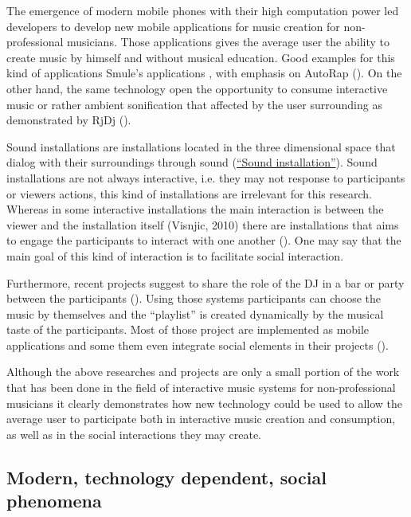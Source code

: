 The emergence of modern mobile phones with their high computation power led developers to develop new mobile applications for music creation for non-professional musicians. Those applications gives the average user the ability to create music by himself and without musical education. Good examples for this kind of applications Smule's applications , with emphasis on AutoRap (). On the other hand, the same technology open the opportunity to consume interactive music or rather ambient sonification that affected by the user surrounding as demonstrated by RjDj ().

Sound installations are installations located in the three dimensional space that dialog with their surroundings through sound (\href{http://en.wikipedia.org/wiki/Sound_installation}{``Sound installation''}). Sound installations are not always interactive, i.e. they may not response to participants or viewers actions, this kind of installations are irrelevant for this research. Whereas in some interactive installations the main interaction is between the viewer and the installation itself (Visnjic, 2010) there are installations that aims to engage the participants to interact with one another (). One may say that the main goal of this kind of interaction is to facilitate social interaction.

Furthermore, recent projects suggest to share the role of the DJ in a bar or party between the participants (). Using those systems participants can choose the music by themselves and the ``playlist'' is created dynamically by the musical taste of the participants. Most of those project are implemented as mobile applications and some them even integrate social elements in their projects ().

Although the above researches and projects are only a small portion of the work that has been done in the field of interactive music systems for non-professional musicians it clearly demonstrates how new technology could be used to allow the average user to participate both in interactive music creation and consumption, as well as in the social interactions they may create.

\subsection{Modern, technology dependent, social phenomena}

